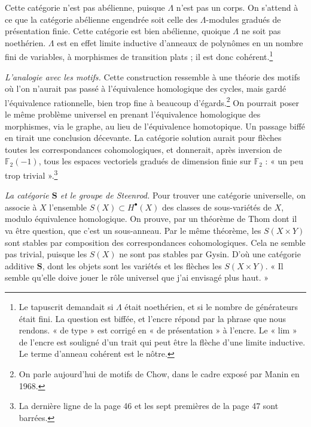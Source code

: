 \documentclass[11pt,a4paper]{article}
\begin{document}
Cette catégorie n'est pas abélienne, puisque $\Lambda$ n'est pas un corps. On
s'attend à ce que la catégorie abélienne engendrée soit celle des
$\Lambda$-modules gradués de présentation finie. Cette catégorie est bien
abélienne, quoique $\Lambda$ ne soit pas noethérien. $\Lambda$ est en effet
limite inductive d'anneaux de polynômes en un nombre fini de variables, à
morphismes de transition plats ; il est donc cohérent.\footnote{Le tapuscrit
demandait si $\Lambda$ était noethérien, et si le nombre de générateurs était
fini. La question est biffée, et l'encre répond par la phrase que nous
rendons. « de type » est corrigé en « de présentation » à l'encre. Le « lim »
de l'encre est souligné d'un trait qui peut être la flèche d'une limite
inductive. Le terme d'anneau cohérent est le nôtre.}

\emph{L'analogie avec les motifs.} Cette construction ressemble à une théorie
des motifs où l'on n'aurait pas passé à l'équivalence homologique des cycles,
mais gardé l'équivalence rationnelle, bien trop fine à beaucoup
d'égards.\footnote{On parle aujourd'hui de motifs de Chow, dans le cadre exposé
par Manin en 1968.} On pourrait poser le même problème universel en prenant
l'équivalence homologique des morphismes, via le graphe, au lieu de
l'équivalence homotopique. Un passage biffé en tirait une conclusion
décevante. La catégorie solution aurait pour flèches toutes les correspondances
cohomologiques, et donnerait, après inversion de $\mathbb{F}_2(-1)$, tous les
espaces vectoriels gradués de dimension finie sur $\mathbb{F}_2 $ : « un peu
trop trivial ».\footnote{La dernière ligne de la page 46 et les sept premières
de la page 47 sont barrées.}

\emph{La catégorie $\mathbf{S}$ et le groupe de Steenrod.} Pour trouver une
catégorie universelle, on associe à $X$ l'ensemble $S(X) \subset
H^{\bullet}(X)$ des classes de sous-variétés de $X$, modulo équivalence
homologique. On prouve, par un théorème de Thom dont il va être question, que
c'est un sous-anneau. Par le même théorème, les $S(X \times Y)$ sont stables par
composition des correspondances cohomologiques. Cela ne semble pas trivial,
puisque les $S(X)$ ne sont pas stables par Gysin. D'où une catégorie additive
$\mathbf{S}$, dont les objets sont les variétés et les flèches les $S(X \times
Y)$. « Il semble qu'elle doive jouer le rôle universel que j'ai envisagé plus
haut. »
\end{document}
